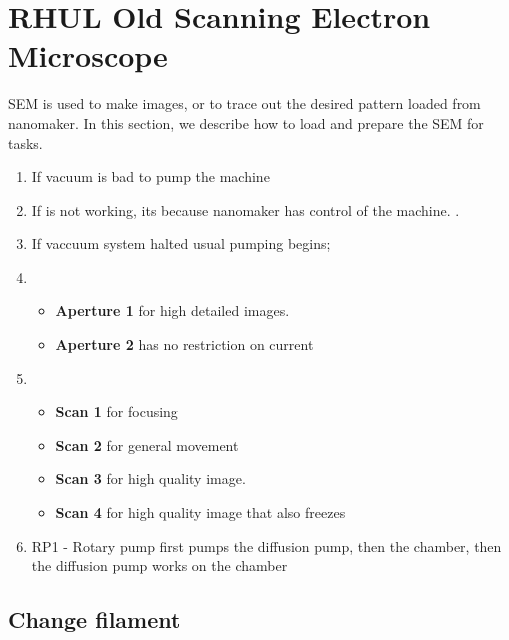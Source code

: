 \section{RHUL Old Scanning Electron Microscope\label{sec:sem}}
\begin{framed}\noindent
  SEM is  used to  make images,  or to trace  out the  desired pattern
  loaded from nanomaker. In this section,  we describe how to load and
  prepare the SEM for tasks.

  \begin{enumerate}
  \item If  vacuum is  bad  to
    pump the machine
  \item If   is  not working, its because  nanomaker has
    control of  the machine.  .
  \item If vaccuum system halted  \ira {} usual pumping begins;
  \item \begin{itemize}
    \item \textbf{Aperture  1} for  high detailed images.  
    \item \textbf{Aperture 2} has no restriction on current
    \end{itemize}
  \item \begin{itemize}
    \item \textbf{Scan 1} for focusing
    \item \textbf{Scan 2} for general movement
    \item \textbf{Scan 3} for high quality image. 
    \item \textbf{Scan 4} for high quality image that also freezes
    \end{itemize}
  \item RP1  - Rotary pump  first pumps  the diffusion pump,  then the
    chamber, then the diffusion pump works on the chamber
  \end{enumerate}
\end{framed}

\subsection*{Change filament}

